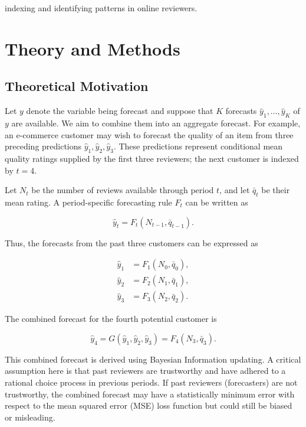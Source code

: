 \documentclass[conference]{IEEEtran}
\theoremstyle{plain}
\theoremstyle{definition}
\theoremstyle{remark}
\begin{document}
indexing and identifying patterns in online reviewers.
	
	\section{Theory and Methods}
	\subsection{Theoretical Motivation}
	Let \(y\) denote the variable being forecast and suppose that \(K\) forecasts \(\hat y_1,\ldots,\hat y_K\) of \(y\) are available. We aim to combine them into an aggregate forecast. For example, an e-commerce customer may wish to forecast the quality of an item from three preceding predictions \(\hat y_1,\hat y_2,\hat y_3\). These predictions represent conditional mean quality ratings supplied by the first three reviewers; the next customer is indexed by \(t=4\).
	
	Let \(N_t\) be the number of reviews available through period \(t\), and let \(\bar q_t\) be their mean rating. A period-specific forecasting rule \(F_t\) can be written as
	
	\begin{equation}
		\hat y_t=F_t(N_{t-1},\bar q_{t-1}).
	\end{equation}
	
	Thus, the forecasts from the past three customers can be expressed as
	
	\begin{equation}
		\begin{aligned}
			\hat y_1 &= F_1(N_0,\bar q_0), \\
			\hat y_2 &= F_2(N_1,\bar q_1), \\
			\hat y_3 &= F_3(N_2,\bar q_2).
		\end{aligned}
	\end{equation}
	
	The combined forecast for the fourth potential customer is
	
	\begin{equation}
		\hat y_4=G(\hat y_1,\hat y_2,\hat y_3)=F_4(N_3,\bar q_3).
	\end{equation}
	
	This combined forecast is derived using Bayesian Information updating. A critical assumption here is that past reviewers are trustworthy and have adhered to a rational choice process in previous periods. If past reviewers (forecasters) are not trustworthy, the combined forecast may have a statistically minimum error with respect to the mean squared error (MSE) loss function but could still be biased or misleading.
	
\end{document}
